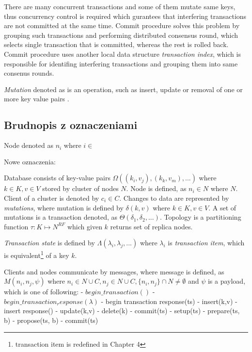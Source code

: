 There are many concurrent transactions and some of them mutate same keys, thus concurrency control is required which gurantees that interfering transactions are not committed at the same time. Commit procedure solves this problem by grouping such transactions and performing distributed consensus round, which selects single transaction that is committed, whereas the rest is rolled back.
Commit procedure uses another local data structure \emph{transaction index}, which is responsible for identifing interfering transactions and grouping them into same consenus rounds.

\begin{definition}
  \label{def:mutation}
  \emph{Mutation} denoted as  is an operation, such as insert, update or removal of one or more key value pairs \kv.
\end{definition}


\subsection{Brudnopis z oznaczeniami}

Node denoted as $n_i$ where $i \in $


Nowe oznaczenia:

Database consists of key-value pairs $\Omega((k_{i},v_{j}), (k_{k},v_{m}),...)$ where $k\in\mathit{K}, v\in\mathit{V}$ stored by cluster of nodes $\mathit{N}$. Node is defined, as $n_{i}\in\mathit{N}$ where $\mathit{N}$. Client of a cluster is denoted by $c_{i}\in\mathit{C}$. Changes to data are represented by \emph{mutations}, where mutation is defined by $\delta(k,v)$ where $k \in \mathit{K}, v \in \mathit{V}$.
A set of mutations is a transaction denoted, as $\Theta(\delta_{1}, \delta_{2}, ...)$. Topology is a partitioning function $\tau:\mathit{K} \mapsto \mathit{N^{RF}}$ which given $k$ returns set of replica nodes. 

\emph{Transaction state} is defined by $\Lambda(\lambda_{i}, \lambda_{j}, ...)$ where $\lambda_{i}$ is \emph{transaction item}, which is equivalent\footnote{transaction item is redefined in Chapter 4} of a key $k$.


Clients and nodes communicate by messages, where message is defined, as $\mathit{M}(n_{i}, n_{j}, \psi)$ where 
$n_{i}\in\mathit{N}\cup\mathit{C}, n_{j}\in\mathit{N}\cup\mathit{C},\{n_{i}, n_{j}\}\cap\mathit{N}\neq\emptyset$ and $\psi$ is a payload, which is one of following:
- $\mathit{begin\_transaction}()$
- $\mathit{begin\_transaction_response}(\lambda)$
- begin transaction response(ts)
- insert(k,v)
- insert response()
- update(k,v)
- delete(k)
- commit(ts)
- setup(ts)
- prepare(ts, b)
- propose(ts, b)
- commit(ts)


